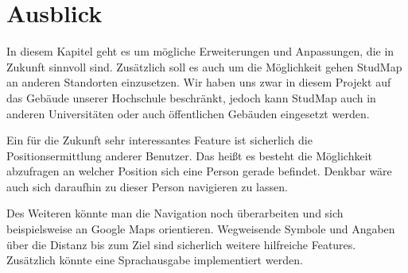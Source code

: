 \chapter{Ausblick}
In diesem Kapitel geht es um mögliche Erweiterungen und Anpassungen, die in Zukunft sinnvoll sind. Zusätzlich soll es auch um die Möglichkeit gehen StudMap an anderen Standorten einzusetzen. Wir haben uns zwar in diesem Projekt auf das Gebäude unserer Hochschule beschränkt, jedoch kann StudMap auch in anderen Universitäten oder auch öffentlichen Gebäuden eingesetzt werden.

Ein für die Zukunft sehr interessantes Feature ist sicherlich die Positionsermittlung anderer Benutzer. Das heißt es besteht die Möglichkeit abzufragen an welcher Position sich eine Person gerade befindet. Denkbar wäre auch sich daraufhin zu dieser Person navigieren zu lassen.

Des Weiteren könnte man die Navigation noch überarbeiten und sich beispielsweise an Google Maps orientieren. Wegweisende Symbole und Angaben über die Distanz bis zum Ziel sind sicherlich weitere hilfreiche Features. Zusätzlich könnte eine Sprachausgabe implementiert werden.

